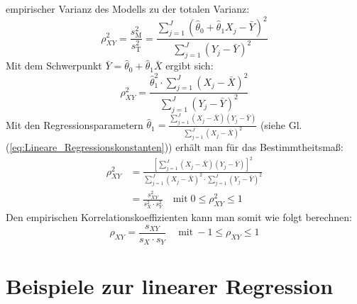 empirischer Varianz des Modells zu der totalen Varianz:
\[
\rho_{XY}^2 = \frac{s_{\mathrm{M}}^2}{s_{\mathrm{T}}^2} = \frac{\sum\limits_{j = 1}^J {(\hat{\theta}_0 + \hat{\theta}_1 X_j - \bar {Y})^2} }{\sum\limits_{j = 1}^J {(Y_j - \bar{Y})^2} }
\]
Mit dem Schwerpunkt $\bar {Y} = \hat{\theta}_0 + \hat{\theta}_1 \bar {X}$ ergibt sich:
\[
\rho_{XY}^2 = \frac{\hat{\theta}_1^2 \cdot \sum\limits_{j = 1}^J
	{(X_j - \bar X)^2} }{\sum\limits_{j = 1}^J {(Y_j - \bar {Y})^2} }
\]
Mit den Regressionsparametern $\hat{\theta}_1 = \frac{\sum\limits_{j =
		1}^J {(X_j - \bar {X})(Y_j - \bar {Y})} }{\sum\limits_{j = 1}^J {(X_j
		- \bar {X})^2} }$ (siehe Gl.(\ref{eq:Lineare_Regressionskonstanten})) erhält man für das
Bestimmtheitsmaß:
\begin{align}
\rho_{XY}^2 &= \frac{\left[ {\sum\limits_{j = 1}^J {(X_j - \bar {X})(Y_j - \bar{Y})} } \right]^2}{\sum\limits_{j = 1}^J {(X_j - \bar {X})^2}
	\cdot
	\sum\limits_{j = 1}^J {(Y_j - \bar {Y})^2} } \nonumber \\[2ex]
&= \frac{s_{XY} ^2}{s_X ^2 \cdot s_Y ^2} \quad \textrm{mit}\;
0 \le \rho_{XY}^2 \le 1
\end{align}
Den empirischen Korrelationskoeffizienten kann man somit wie folgt
berechnen:
\begin{equation}
\rho_{XY} = \frac{ s_{XY} }{ s_X \cdot s_Y } \quad \mathrm{~mit~}  - 1 \le \rho_{XY} \le 1
\end{equation}
\newpage
\section{Beispiele zur linearer Regression}
\label{Vorl2Regressionsaufg2}
